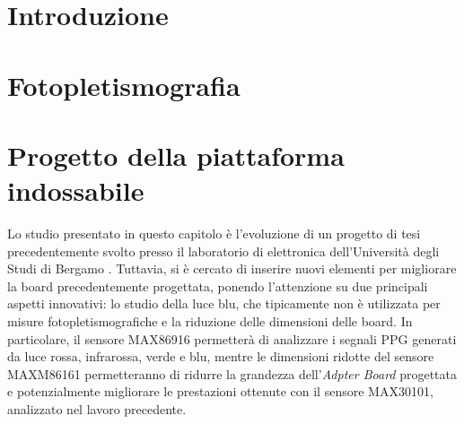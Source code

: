 \documentclass[
	a4paper,
	cleardoublepage=empty,
	headings=twolinechapter,
	numbers=autoenddot,
]{scrbook}
\begin{document}
	\frontmatter
	
	\begin{frontespizio}
		\Margini{3cm}{3cm}{3cm}{3cm}
		\Punteggiatura{}
		\begin{Preambolo*}
			\usepackage[italian]{babel}
			\usepackage[T1]{fontenc}
			\usepackage[utf8]{inputenc}
			\usepackage{microtype}
			\usepackage{lmodern}
			\graphicspath{{img/}}
			
			\renewcommand{\frontinstitutionfont}{\fontsize{14}{17}\bfseries\scshape}
			\renewcommand{\fronttitlefont}{\fontsize{17}{21}\bfseries\scshape}
			\renewcommand{\frontfootfont}{\fontsize{12}{14}\bfseries\scshape}
		\end{Preambolo*}
	\end{frontespizio}
	
	\tableofcontents
	\listoffigures
	\mainmatter
	
	\chapter*{Introduzione}
	
	\chapter{Fotopletismografia}
	
	\chapter{Progetto della piattaforma indossabile}
	Lo studio presentato in questo capitolo è l'evoluzione di un progetto di tesi precedentemente svolto presso il laboratorio di elettronica dell’Università degli Studi di Bergamo \cite{Ingegneria2018}. Tuttavia, si è cercato di inserire nuovi elementi per migliorare la board precedentemente progettata, ponendo l'attenzione su due principali aspetti innovativi: lo studio della luce blu, che tipicamente non è utilizzata per misure fotopletismografiche e la riduzione delle dimensioni delle board. In particolare, il sensore MAX86916 permetterà di analizzare i segnali PPG generati da luce rossa, infrarossa, verde e blu, mentre le dimensioni ridotte del sensore MAXM86161 permetteranno di ridurre la grandezza dell'\textit{Adpter Board} progettata e potenzialmente migliorare le prestazioni ottenute con il sensore MAX30101, analizzato nel lavoro precedente\cite{Ingegneria2018}.
	
\end{document}

